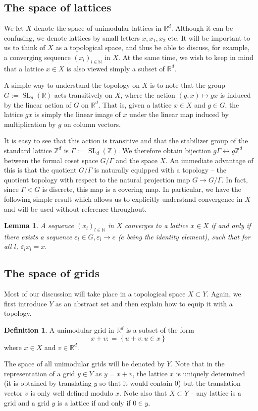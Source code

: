 \documentclass[reqno,11pt, twoside]{amsart}
\theoremstyle{plain}
\newtheorem{lem}[thm]{Lemma}
\theoremstyle{definition}
\newtheorem{defn}[thm]{Definition}
\theoremstyle{definition}
\theoremstyle{remark}
\numberwithin{equation}{section}
\newcommand{\SL}{\operatorname{SL}}
\newcommand{\Ga}{\Gamma}
\newcommand{\bR}{\mathbb{R}}
\newcommand{\bZ}{\mathbb{Z}}
\newcommand{\bN}{\mathbb{N}}
\newcommand\seta[1]{\left\{#1\right\}}
\begin{document}
\subsection{The space of lattices}
We let 
$X$ denote the space of unimodular lattices in $\bR^d$. Although it can be 
confusing, we denote lattices by small letters $x, x_1, x_2$ etc. It will be important to us to think of $X$ as a topological space, and thus be able to discuss, for example, a converging sequence $(x_l)_{l\in \bN}$ in $X$. At the 
same time, we wish to keep in mind that a lattice $x\in X$ is also viewed simply a subset of $\bR^d$. 

A simple way to understand the topology on $X$ is to note that the group
$G:=\SL_d(\bR)$ acts transitively on $X$, where the action $(g,x)\mapsto gx$ 
is induced by the linear action of $G$ on $\bR^d$. That is, given a lattice $x\in X$ and $g\in G$, the lattice $gx$ is simply the linear image of $x$ under the linear map induced by multiplication by $g$ on column vectors. 

It is easy to see that this action is transitive and that the stabilizer group of the standard lattice $\bZ^d$ is $\Ga:= \SL_d(\bZ)$. We therefore obtain bijection $g\Ga\leftrightarrow g\bZ^d$ between the formal coset space $G/\Ga$ and the space $X$. An immediate advantage of this is that the quotient
$G/\Ga$ is naturally equipped with a topology -- the quotient topology with respect to the natural projection map $G\to G/\Ga$. In fact, since $\Ga<G$ is discrete, this map is a covering map. In particular, we have the following simple result which allows us to explicitly understand convergence in $X$ and 
will be used without reference throughout.
\begin{lem}
    A sequence $(x_l)_{l\in \bN}$ in $X$ converges to a lattice $x\in X$ if and only if there exists a sequence $\varepsilon_l\in G, \varepsilon_l\to e$ ($e$ being the identity element), such that for all $l$, 
    $\varepsilon_l x_l=x.$
\end{lem}

\subsection{The space of grids}
Most of our discussion will take place in a topological space $X\subset Y$. 
Again, we first introduce $Y$ as an abstract set and then explain how to 
equip it with a topology. 
\begin{defn}
    \label{defn: grids}
    A unimodular grid in $\bR^d$ is a subset of the form 
    $$x+v: = \seta{u+v:u\in x}$$
    where $x\in X$ and $v\in \bR^d$.
\end{defn}
The space of all unimodular grids will be denoted by $Y$. Note that in the representation of a grid $y\in Y$ as $y=x+v$, the lattice $x$ is uniquely determined (it is obtained by translating $y$ so that it would contain $0$)
but the translation vector $v$ is only well defined modulo $x$. 
Note also that $X\subset Y$ -- any lattice is a grid and a grid $y$ is a lattice if and only if $0\in y$.
\end{document}
